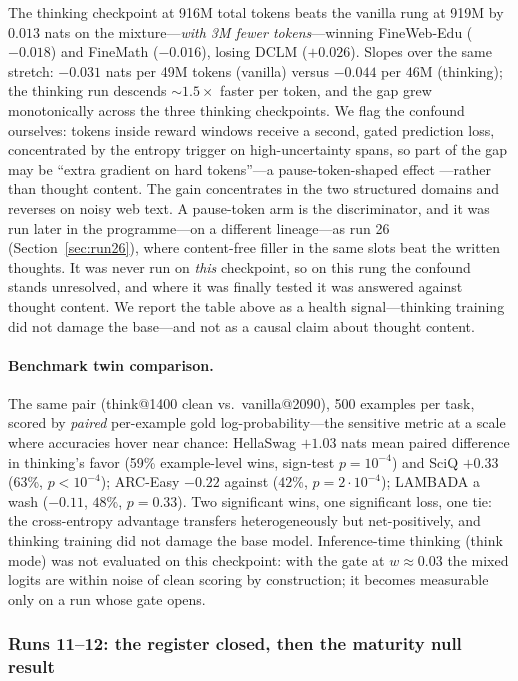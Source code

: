 \documentclass{article} %
\begin{document}
The thinking checkpoint at 916M total tokens beats the vanilla rung at 919M by $0.013$ nats on the mixture---\emph{with 3M fewer tokens}---winning FineWeb-Edu ($-0.018$) and FineMath ($-0.016$), losing DCLM ($+0.026$). Slopes over the same stretch: $-0.031$ nats per 49M tokens (vanilla) versus $-0.044$ per 46M (thinking); the thinking run descends ${\sim}1.5\times$ faster per token, and the gap grew monotonically across the three thinking checkpoints. We flag the confound ourselves: tokens inside reward windows receive a second, gated prediction loss, concentrated by the entropy trigger on high-uncertainty spans, so part of the gap may be ``extra gradient on hard tokens''---a pause-token-shaped effect \citep{goyal2024think}---rather than thought content. The gain concentrates in the two structured domains and reverses on noisy web text. A pause-token arm is the discriminator, and it was run later in the programme---on a different lineage---as run 26 (Section~\ref{sec:run26}), where content-free filler in the same slots beat the written thoughts. It was never run on \emph{this} checkpoint, so on this rung the confound stands unresolved, and where it was finally tested it was answered against thought content. We report the table above as a health signal---thinking training did not damage the base---and not as a causal claim about thought content.

\paragraph{Benchmark twin comparison.} The same pair (think@1400 clean vs.\ vanilla@2090), 500 examples per task, scored by \emph{paired} per-example gold log-probability---the sensitive metric at a scale where accuracies hover near chance: HellaSwag $+1.03$ nats mean paired difference in thinking's favor (59\% example-level wins, sign-test $p{=}10^{-4}$) and SciQ $+0.33$ (63\%, $p{<}10^{-4}$); ARC-Easy $-0.22$ against ($42\%$, $p{=}2{\cdot}10^{-4}$); LAMBADA a wash ($-0.11$, $48\%$, $p{=}0.33$). Two significant wins, one significant loss, one tie: the cross-entropy advantage transfers heterogeneously but net-positively, and thinking training did not damage the base model. Inference-time thinking (think mode) was not evaluated on this checkpoint: with the gate at $w \approx 0.03$ the mixed logits are within noise of clean scoring by construction; it becomes measurable only on a run whose gate opens.

\subsubsection{Runs 11--12: the register closed, then the maturity null result}
\label{sec:run1112}
\end{document}
